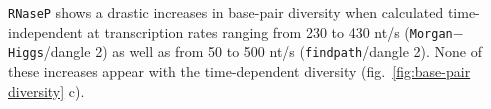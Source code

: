 \documentclass[ twoside,openright,titlepage,numbers=noenddot,headinclude,%
                footinclude=false, cleardoublepage=empty,abstractoff, %
                BCOR=5mm,paper=a4,fontsize=11pt,%
                ngerman,american,%
                ]{scrreprt}
\begin{document}
\texttt{RNaseP} shows a drastic increases in base-pair diversity when calculated
time-independent at transcription rates ranging from 230 to 430 nt/s
(\texttt{Morgan$-$Higgs}/dangle 2) as well as from 50 to 500 nt/s
(\texttt{findpath}/dangle 2). None of these increases appear with the time-dependent
diversity (fig.~\ref{fig:base-pair diversity} c).



 
\end{document}
